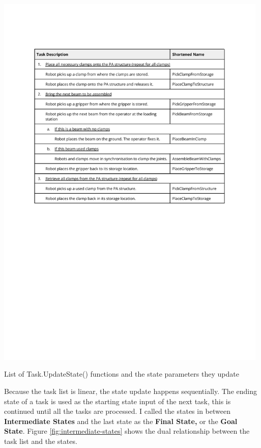 \begin{table}[!h]
    \includegraphics[page=6, trim=25.4mm 110mm 24.5mm 33mm, clip, width=0.98\textwidth]{tables/Tables in Chapter 6.pdf}
    \caption{List of Task.UpdateState() functions and the state parameters they update}
    \label{table:task-update-state-functions}
\end{table}


Because the task list is linear, the state update happens sequentially. The ending state of a task is used as the starting state input of the next task, this is continued until all the tasks are processed. I called the states in between \textbf{Intermediate States }and the last state as the \textbf{Final State, }or the \textbf{Goal State}. Figure \ref{fig:intermediate-states} shows the dual relationship between the task list and the states.

